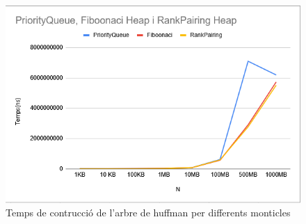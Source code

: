 \documentclass{ieeetj}
\begin{document}
\begin{figure}[H]
    \centering
    \includegraphics[width=1\linewidth]{png/three queues appear at Memorias edge.png}
    \caption{Temps de contrucció de l'arbre de huffman per differents monticles}
    \label{fig:enter-label}
\end{figure}
\end{document}
